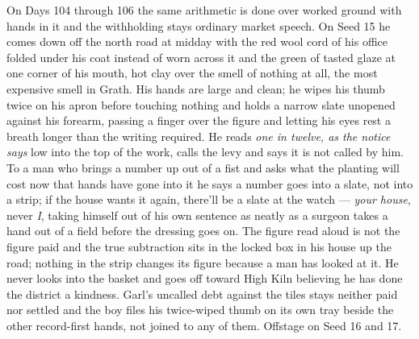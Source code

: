 \documentclass{design/chronicle}
\begin{document}
{On Days 104 through 106 the same arithmetic is done over worked ground with hands in it and the withholding stays ordinary market speech. On Seed 15 he comes down off the north road at midday with the red wool cord of his office folded under his coat instead of worn across it and the green of tasted glaze at one corner of his mouth, hot clay over the smell of nothing at all, the most expensive smell in Grath. His hands are large and clean; he wipes his thumb twice on his apron before touching nothing and holds a narrow slate unopened against his forearm, passing a finger over the figure and letting his eyes rest a breath longer than the writing required. He reads \emph{one in twelve, as the notice says} low into the top of the work, calls the levy and says it is not called by him. To a man who brings a number up out of a fist and asks what the planting will cost now that hands have gone into it he says a number goes into a slate, not into a strip; if the house wants it again, there’ll be a slate at the watch --- \emph{your house}, never \emph{I}, taking himself out of his own sentence as neatly as a surgeon takes a hand out of a field before the dressing goes on. The figure read aloud is not the figure paid and the true subtraction sits in the locked box in his house up the road; nothing in the strip changes its figure because a man has looked at it. He never looks into the basket and goes off toward High Kiln believing he has done the district a kindness. Garl’s uncalled debt against the tiles stays neither paid nor settled and the boy files his twice-wiped thumb on its own tray beside the other record-first hands, not joined to any of them. Offstage on Seed 16 and 17.

}
\end{document}
